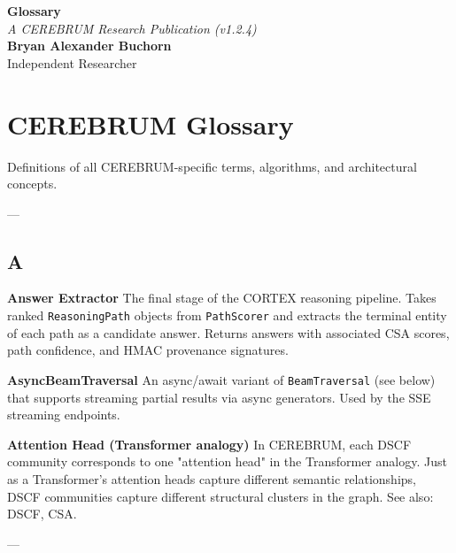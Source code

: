 \documentclass[11pt,article,oneside]{memoir}
\begin{document}
\begin{center}
    \Huge \textbf{Glossary} \\
    \vspace{0.5em}
    \large \textit{A CEREBRUM Research Publication (v1.2.4)} \\
    \vspace{1em}
    \large \textbf{Bryan Alexander Buchorn} \\
    Independent Researcher \\
    \vspace{2em}
\end{center}

\begin{abstract}
\textbf{Overview:} This guide provides a conceptual entry point into the CEREBRUM framework. It is designed for practitioners and researchers seeking to understand the core reasoning signals of Framework Implementation Guide.
\end{abstract}

\section{CEREBRUM Glossary}

Definitions of all CEREBRUM-specific terms, algorithms, and archi\-tectural concepts.

---

\subsection{A}

\textbf{Answer Extractor}
The final stage of the CORTEX reasoning pipeline. Takes ranked \texttt{ReasoningPath} objects from \texttt{PathScorer} and extracts the terminal entity of each path as a candidate answer. Returns answers with associated CSA scores, path confidence, and HMAC provenance signatures.

\textbf{AsyncBeamTraversal}
An async/await variant of \texttt{BeamTraversal} (see below) that supports streaming partial results via async generators. Used by the SSE streaming endpoints.

\textbf{Attention Head (Transformer analogy)}
In CEREBRUM, each DSCF community corresponds to one "attention head" in the Transformer analogy. Just as a Transformer's attention heads capture different semantic relat\-ionships, DSCF communities capture different structural clusters in the graph. See also: DSCF, CSA.

---
\end{document}
